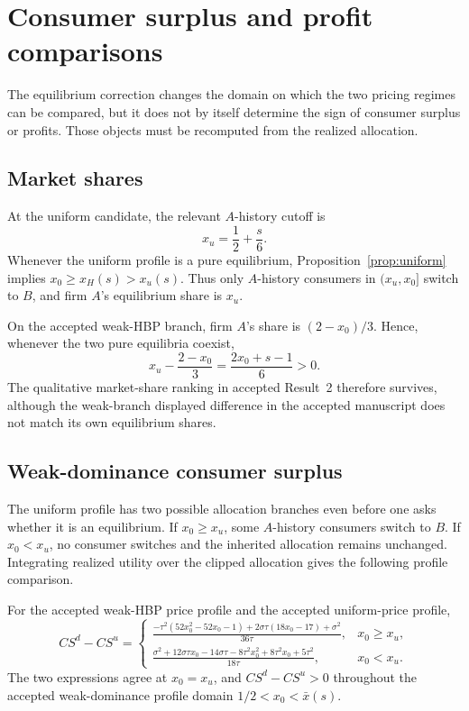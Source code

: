 \section{Consumer surplus and profit comparisons}
\label{sec:comparisons}

The equilibrium correction changes the domain on which the two pricing regimes can be compared, but it does not by itself determine the sign of consumer surplus or profits. Those objects must be recomputed from the realized allocation.

\subsection{Market shares}

At the uniform candidate, the relevant \(A\)-history cutoff is
\[
x_u=\frac12+\frac{s}{6}.
\]
Whenever the uniform profile is a pure equilibrium, Proposition~\ref{prop:uniform} implies \(x_0\ge x_H(s)>x_u(s)\). Thus only \(A\)-history consumers in \((x_u,x_0]\) switch to \(B\), and firm \(A\)'s equilibrium share is \(x_u\).

On the accepted weak-HBP branch, firm \(A\)'s share is \((2-x_0)/3\). Hence, whenever the two pure equilibria coexist,
\begin{equation}
x_u-\frac{2-x_0}{3}
=
\frac{2x_0+s-1}{6}>0.
\label{eq:share-gap}
\end{equation}
The qualitative market-share ranking in accepted Result~2 therefore survives, although the weak-branch displayed difference in the accepted manuscript does not match its own equilibrium shares.

\subsection{Weak-dominance consumer surplus}

The uniform profile has two possible allocation branches even before one asks whether it is an equilibrium. If \(x_0\ge x_u\), some \(A\)-history consumers switch to \(B\). If \(x_0<x_u\), no consumer switches and the inherited allocation remains unchanged. Integrating realized utility over the clipped allocation gives the following profile comparison.

\begin{proposition}
\label{prop:weak-cs}
For the accepted weak-HBP price profile and the accepted uniform-price profile,
\[
CS^d-CS^u=
\begin{cases}
\displaystyle
\frac{-\tau^2(52x_0^2-52x_0-1)
+2\sigma\tau(18x_0-17)+\sigma^2}{36\tau},
&x_0\ge x_u,\\[1.2em]
\displaystyle
\frac{\sigma^2+12\sigma\tau x_0-14\sigma\tau
-8\tau^2x_0^2+8\tau^2x_0+5\tau^2}{18\tau},
&x_0<x_u.
\end{cases}
\]
The two expressions agree at \(x_0=x_u\), and \(CS^d-CS^u>0\) throughout the accepted weak-dominance profile domain \(1/2<x_0<\bar x(s)\).
\end{proposition}

